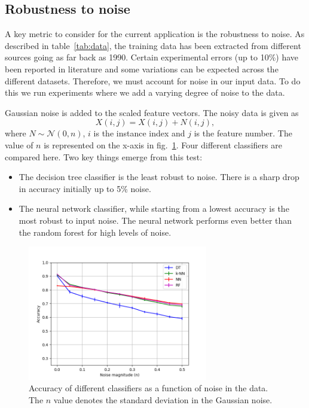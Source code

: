 \documentclass{article}
\begin{document}
\subsection{Robustness to noise}
A key metric to consider for the current application is the robustness to noise. As described in table~\ref{tab:data}, the training data has been extracted from different sources going as far back as 1990. Certain experimental errors (up to 10\%) have been reported in literature and some variations can be expected across the different datasets. Therefore, we must account for noise in our input data. To do this we run experiments where we add a varying degree of noise to the data.

Gaussian noise is added to the scaled feature vectors. The noisy data is given as 
\begin{equation}
X(i, j) = X(i, j) + N(i, j),
\end{equation}
where $N \sim \mathcal{N}(0, n)$, $i$ is the instance index and $j$ is the feature number. The value of $n$ is represented on the x-axis in fig.~\ref{fig:noise}. Four different classifiers are compared here. Two key things emerge from this test:
\begin{itemize}
\item The decision tree classifier is the least robust to noise. There is a sharp drop in accuracy initially up to 5\% noise.
\item The neural network classifier, while starting from a lowest accuracy is the most robust to input noise. The neural network performs even better than the random forest for high levels of noise.
\end{itemize}

\begin{figure}[h]
	\centering
	\includegraphics[width=0.7\textwidth]{../figures/accuracy_with_noise.png}
	\caption{Accuracy of different classifiers as a function of noise in the data. The $n$ value denotes the standard deviation in the Gaussian noise. }
	\label{fig:noise}
\end{figure}
\end{document}
